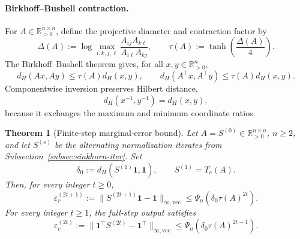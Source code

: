\documentclass[10pt]{article}
\numberwithin{equation}{section}
\theoremstyle{plain}
\newtheorem{theorem}{Theorem}[section]
\theoremstyle{definition}
\theoremstyle{remark}
\newcommand{\R}{\mathbb{R}}
\newcommand{\ones}{\mathbf{1}}
\begin{document}
\paragraph{Birkhoff--Bushell contraction.}
For \(A\in\R_{>0}^{n\times n}\), define the projective diameter and contraction
factor by
\begin{equation}\label{eq:projective-diameter}
\Delta(A):=\log\max_{i,k,j,\ell}\frac{A_{ij}A_{k\ell}}{A_{i\ell}A_{kj}},
\qquad
\tau(A):=\tanh\!\left(\frac{\Delta(A)}4\right).
\end{equation}
The Birkhoff--Bushell theorem \citep{Birkhoff1957,Bushell1973} gives, for all
\(x,y\in\R^n_{>0}\),
\begin{equation}\label{eq:birkhoff-contraction}
 d_H(Ax,Ay)\le\tau(A)d_H(x,y),\qquad
 d_H(A^\top x,A^\top y)\le\tau(A)d_H(x,y).
\end{equation}
Componentwise inversion preserves Hilbert distance,
\begin{equation}\label{eq:hilbert-inversion}
 d_H(x^{-1},y^{-1})=d_H(x,y),
\end{equation}
because it exchanges the maximum and minimum coordinate ratios.

\begin{theorem}[Finite-step marginal-error bound]\label{thm:sinkhorn}
Let \(A=S^{(0)}\in\R_{>0}^{n\times n}\), \(n\ge2\), and let \(S^{(s)}\) be the
alternating normalization iterates from Subsection~\ref{subsec:sinkhorn-iter}. Set
\[
        \delta_0:=d_H(S^{(1)}\ones,\ones),\qquad S^{(1)}=T_c(A).
\]
Then, for every integer \(t\ge0\),
\begin{equation}\label{eq:row-certificate-tau}
\varepsilon_r^{(2t+1)}
:=\|S^{(2t+1)}\ones-\ones\|_{\infty,\mathrm{vec}}
\le
\Psi_n\!\left(\delta_0\tau(A)^{2t}\right).
\end{equation}
For every integer \(t\ge1\), the full-step output satisfies
\begin{equation}\label{eq:column-certificate-tau}
\varepsilon_c^{(2t)}
:=\|\ones^\top S^{(2t)}-\ones^\top\|_{\infty,\mathrm{vec}}
\le
\Psi_n\!\left(\delta_0\tau(A)^{2t-1}\right).
\end{equation}
\end{theorem}
\end{document}
